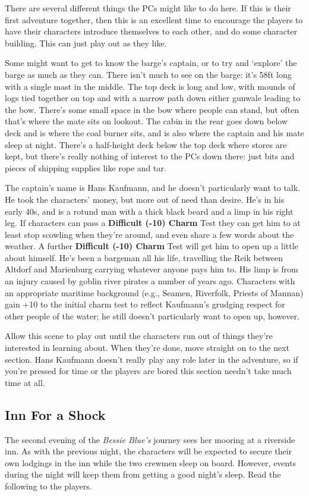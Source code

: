 There are several different things the PCs might like to do here. If this is
their first adventure together, then this is an excellent time to encourage the
players to have their characters introduce themselves to each other, and do some
character building. This can just play out as they like.

Some might want to get to know the barge's captain, or to try and `explore' the
barge as much as they can. There isn't much to see on the barge: it's 58ft long
with a single mast in the middle. The top deck is long and low, with mounds of
logs tied together on top and with a narrow path down either gunwale leading to
the bow. There's some small space in the bow where people can stand, but often
that's where the mate sits on lookout. The cabin in the rear goes down below
deck and is where the coal burner sits, and is also where the captain and his
mate sleep at night. There's a half-height deck below the top deck where stores
are kept, but there's really nothing of interest to the PCs down there: just
bits and pieces of shipping supplies like rope and tar.

The captain's name is Hans Kaufmann, and he doesn't particularly want to talk.
He took the characters' money, but more out of need than desire. He's in his
early 40s, and is a rotund man with a thick black beard and a limp in his right
leg. If characters can pass a \textbf{Difficult \mbox{(-10)} Charm} Test they can
get him to at least stop scowling when they're around, and even share a few
words about the weather. A further \textbf{Difficult (-10) Charm} Test will
get him to open up a little about himself. He's been a bargeman all his life,
travelling the Reik between Altdorf and Marienburg carrying whatever anyone pays
him to. His limp is from an injury caused by goblin river pirates a number of
years ago. Characters with an appropriate maritime background (e.g., Seamen,
Riverfolk, Priests of Mannan) gain +10 to the initial charm test to reflect
Kaufmann's grudging respect for other people of the water; he still doesn't
particularly want to open up, however.

Allow this scene to play out until the characters run out of things they're
interested in learning about. When they're done, move straight on to the
next section. Hans Kaufmann doesn't really play any role later in the adventure,
so if you're pressed for time or the players are bored this section needn't take
much time at all.

\subsection{Inn For a Shock}\label{act1scene2}
The second evening of the \textit{Bessie Blue's} journey sees her mooring at
a riverside inn. As with the previous night, the characters will be expected to
secure their own lodgings in the inn while the two crewmen sleep on board.
However, events during the night will keep them from getting a good night's
sleep. Read the following to the players.

